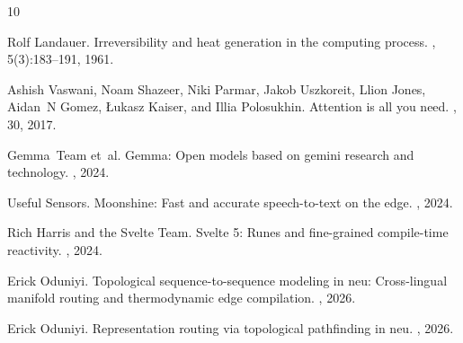 \documentclass[11pt]{article}
\begin{document}

\begin{thebibliography}{10}\small\setlength{\itemsep}{0.5pt}\setlength{\parskip}{0pt}

Rolf Landauer.
\newblock Irreversibility and heat generation in the computing process.
, 5(3):183--191, 1961.

Ashish Vaswani, Noam Shazeer, Niki Parmar, Jakob Uszkoreit, Llion Jones, Aidan~N Gomez, {\L}ukasz Kaiser, and Illia Polosukhin.
\newblock Attention is all you need.
, 30, 2017.

Gemma~Team et~al.
\newblock Gemma: Open models based on gemini research and technology.
, 2024.

Useful Sensors.
\newblock Moonshine: Fast and accurate speech-to-text on the edge.
, 2024.

Rich Harris and the Svelte Team.
\newblock Svelte 5: Runes and fine-grained compile-time reactivity.
, 2024.

Erick Oduniyi.
\newblock Topological sequence-to-sequence modeling in neu: Cross-lingual manifold routing and thermodynamic edge compilation.
, 2026.

Erick Oduniyi.
\newblock Representation routing via topological pathfinding in neu.
, 2026.

\end{thebibliography}
\end{document}

